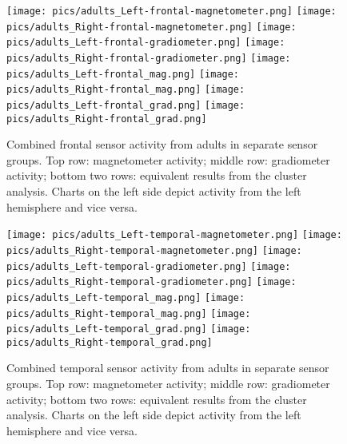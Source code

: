 \begin{figure}[h]
\begin{center}
\texttt{[image: pics/adults\_Left-frontal-magnetometer.png]}
\texttt{[image: pics/adults\_Right-frontal-magnetometer.png]}
\texttt{[image: pics/adults\_Left-frontal-gradiometer.png]}
\texttt{[image: pics/adults\_Right-frontal-gradiometer.png]}
\texttt{[image: pics/adults\_Left-frontal\_mag.png]}
\texttt{[image: pics/adults\_Right-frontal\_mag.png]}
\texttt{[image: pics/adults\_Left-frontal\_grad.png]}
\texttt{[image: pics/adults\_Right-frontal\_grad.png]}
\caption{\label{4.2.activity.adults.frontal} Combined frontal sensor activity from adults in separate sensor groups. Top row: magnetometer activity; middle row: gradiometer activity; bottom two rows: equivalent results from the cluster analysis. Charts on the left side depict activity from the left hemisphere and vice versa.}
\end{center}
\end{figure}


\begin{figure}[h]
\begin{center}
\texttt{[image: pics/adults\_Left-temporal-magnetometer.png]}
\texttt{[image: pics/adults\_Right-temporal-magnetometer.png]}
\texttt{[image: pics/adults\_Left-temporal-gradiometer.png]}
\texttt{[image: pics/adults\_Right-temporal-gradiometer.png]}
\texttt{[image: pics/adults\_Left-temporal\_mag.png]}
\texttt{[image: pics/adults\_Right-temporal\_mag.png]}
\texttt{[image: pics/adults\_Left-temporal\_grad.png]}
\texttt{[image: pics/adults\_Right-temporal\_grad.png]}
\caption{\label{4.2.activity.adults.temporal} Combined temporal sensor activity from adults in separate sensor groups. Top row: magnetometer activity; middle row: gradiometer activity; bottom two rows: equivalent results from the cluster analysis. Charts on the left side depict activity from the left hemisphere and vice versa.}
\end{center}
\end{figure}


